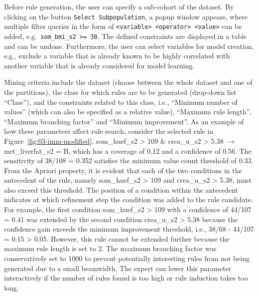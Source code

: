 \documentclass[
  oneside]{book}
\begin{document}
Before rule generation, the user can specify a sub-cohort of the dataset.
By clicking on the button \texttt{Select\ Subpopulation}, a popup window appears, where multiple filter queries in the form of \texttt{\textless{}variable\textgreater{}\ \textless{}operator\textgreater{}\ \textless{}value\textgreater{}} can be added, e.g.~\texttt{som\_bmi\_s2\ \textgreater{}=\ 30}.
The defined constraints are displayed in a table and can be undone.
Furthermore, the user can select variables for model creation, e.g., exclude a variable that is already known to be highly correlated with another variable that is already considered for model learning.

Mining criteria include the dataset (choose between the whole dataset and one of the partitions), the class for which rules are to be generated (drop-down list ``Class''), and the constraints related to this class, i.e., ``Minimum number of values'' (which can also be specified as a relative value), ``Maximum rule length'', ``Maximum branching factor'' and ``Minimum improvement''.
As an example of how these parameters affect rule search, consider the selected rule in Figure~\ref{fig:03-imm-modified}, som\_huef\_s2 \textgreater{} 109 \& crea\_u\_s2 \textgreater{} 5.38 \(\longrightarrow\) mrt\_liverfat\_s2 = B, which has a coverage of 0.12 and a confidence of 0.56.
The sensitivity of 38/108 = 0.352 satisfies the minimum value count threshold of 0.33.
From the Apriori property, it is evident that each of the two conditions in the antecedent of the rule, namely som\_huef\_s2 \textgreater{} 109 and crea\_u\_s2 \textgreater{} 5.38, must also exceed this threshold.
The position of a condition within the antecedent indicates at which refinement step the condition was added to the rule candidate.
For example, the first condition som\_huef\_s2 \textgreater{} 109 with a confidence of 44/107 = 0.41 was extended by the second condition crea\_u\_s2 \textgreater{} 5.38 because the confidence gain exceeds the minimum improvement threshold, i.e., 38/68 - 44/107 = 0.15 \textgreater{} 0.05.
However, this rule cannot be extended further because the maximum rule length is set to 2.
The maximum branching factor was conservatively set to 1000 to prevent potentially interesting rules from not being generated due to a small beamwidth.
The expert can lower this parameter interactively if the number of rules found is too high or rule induction takes too long.
\end{document}
